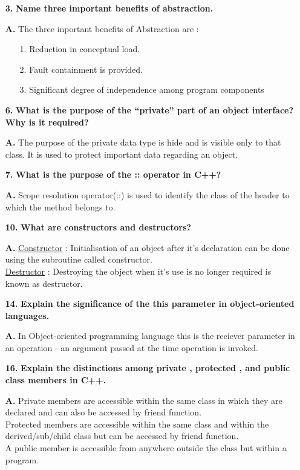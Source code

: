 \documentclass[letterpaper]{article}
\begin{document}
\begin{large}
\begin{flushleft}
\begin{enumerate}
\item[\textbf{3.}]
\textbf{Name three important benefits of abstraction.}
\item[\textbf{A.}]
The three inportant benefits of Abstraction are :
\begin{enumerate}
\item[1.] Reduction in conceptual load.
\item[2.] Fault containment is provided.
\item[3.] Significant degree of independence among program components
\end{enumerate} 

\item[\textbf{6.}]
\textbf{What is the purpose of the “private” part of an object interface? Why is it required?}
\item[\textbf{A.}]
The purpose of the private data type is hide and is visible only to that class. It is used to protect important data regarding an object.

\item[\textbf{7.}]
\textbf{What is the purpose of the :: operator in C++?}
\item[\textbf{A.}]
Scope resolution operator(::) is used to identify the class of the header to which the method belongs to.
 
\item[\textbf{10.}]
\textbf{What are constructors and destructors?}
\item[\textbf{A.}]
\underline{Constructor} : Initialisation of an object after it's declaration can be done using the subroutine called constructor. \\
\underline{Destructor} : Destroying the object when it's use is no longer required is known as destructor.

\item[\textbf{14.}]
\textbf{Explain the significance of the this parameter in object-oriented languages.}
\item[\textbf{A.}]
In Object-oriented programming language this is the reciever parameter in an operation - an argument passed at the time operation is invoked.

\item[\textbf{16.}]
\textbf{Explain the distinctions among private , protected , and public class members in C++.}
\item[\textbf{A.}]
Private members are accessible within the same class in which they are declared and can also be accessed by friend function.\\
Protected members are accessible within the same class and within the derived/sub/child class but can be accessed by friend function.\\
A public member is accessible from anywhere outside the class but within a program.\\ 


\end{enumerate}
\end{flushleft}
\end{large}
\end{document}

